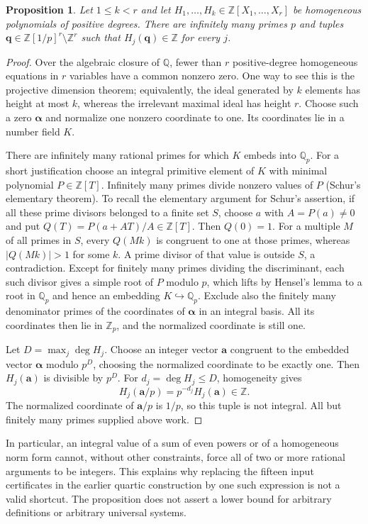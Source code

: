 \documentclass[11pt,a4paper]{article}
\newtheorem{proposition}[theorem]{Proposition}
\newcommand{\Q}{\mathbb Q}\newcommand{\Z}{\mathbb Z}\newcommand{\N}{\mathbb N}
\begin{document}
\begin{proposition}\label{homogeneous}
Let $1\le k<r$ and let
$H_1,\ldots,H_k\in\Z[X_1,\ldots,X_r]$ be homogeneous polynomials of positive
degrees. There are infinitely many primes $p$ and tuples
$\mathbf q\in\Z[1/p]^r\setminus\Z^r$ such that
$H_j(\mathbf q)\in\Z$ for every $j$.
\end{proposition}
\begin{proof}
Over the algebraic closure of $\Q$, fewer than $r$ positive-degree homogeneous
equations in $r$ variables have a common nonzero zero. One way to see this
is the projective dimension theorem; equivalently, the ideal generated by
$k$ elements has height at most $k$, whereas the irrelevant maximal ideal
has height $r$. Choose such a zero $\boldsymbol\alpha$ and normalize one
nonzero coordinate to one. Its coordinates lie in a number field $K$.

There are infinitely many rational primes for which $K$ embeds into $\Q_p$.
For a short justification choose an integral primitive element of $K$ with
minimal polynomial $P\in\Z[T]$. Infinitely many primes divide nonzero values
of $P$ (Schur's elementary theorem). To recall the elementary argument for Schur's assertion, if all these prime
divisors belonged to a finite set $S$, choose $a$ with $A=P(a)\ne0$ and put
$Q(T)=P(a+AT)/A\in\Z[T]$. Then $Q(0)=1$. For a multiple $M$ of all
primes in $S$, every $Q(Mk)$ is congruent to one at those primes, whereas
$|Q(Mk)|>1$ for some $k$. A prime divisor of that value is outside $S$,
a contradiction. Except for finitely many primes dividing
the discriminant, each such divisor gives a simple root of $P$ modulo $p$,
which lifts by Hensel's lemma to a root in $\Q_p$ and hence an embedding
$K\hookrightarrow\Q_p$. Exclude also the finitely many denominator primes
of the coordinates of $\boldsymbol\alpha$ in an integral basis. All its
coordinates then lie in $\Z_p$, and the normalized coordinate is still one.

Let $D=\max_j\deg H_j$. Choose an integer vector $\mathbf a$ congruent to
the embedded vector $\boldsymbol\alpha$ modulo $p^D$, choosing the normalized
coordinate to be exactly one. Then $H_j(\mathbf a)$ is divisible by $p^D$.
For $d_j=\deg H_j\le D$, homogeneity gives
\[
 H_j(\mathbf a/p)=p^{-d_j}H_j(\mathbf a)\in\Z.
\]
The normalized coordinate of $\mathbf a/p$ is $1/p$, so this tuple is not
integral. All but finitely many primes supplied above work.
\end{proof}

In particular, an integral value of a sum of even powers or of a homogeneous
norm form cannot, without other constraints, force all of two or more rational
arguments to be integers. This explains why replacing the fifteen input
certificates in the earlier quartic construction by one such expression
is not a valid shortcut. The proposition does not assert a lower bound for
arbitrary definitions or arbitrary universal systems.
\end{document}
